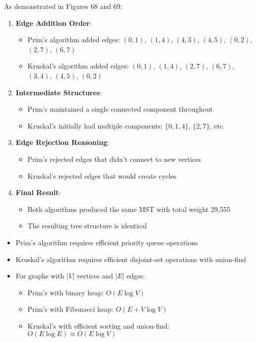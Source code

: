 \documentclass{article}
\theoremstyle{definition}
\begin{document}
As demonstrated in Figures 68 and 69:

\begin{enumerate}
\item \textbf{Edge Addition Order}:
   \begin{itemize}
   \item Prim's algorithm added edges: $(0,1)$, $(1,4)$, $(4,3)$, $(4,5)$, $(0,2)$, $(2,7)$, $(6,7)$
   \item Kruskal's algorithm added edges: $(0,1)$, $(1,4)$, $(2,7)$, $(6,7)$, $(3,4)$, $(4,5)$, $(0,2)$
   \end{itemize}

\item \textbf{Intermediate Structures}:
   \begin{itemize}
   \item Prim's maintained a single connected component throughout
   \item Kruskal's initially had multiple components: $\{0,1,4\}$, $\{2,7\}$, etc.
   \end{itemize}

\item \textbf{Edge Rejection Reasoning}:
   \begin{itemize}
   \item Prim's rejected edges that didn't connect to new vertices
   \item Kruskal's rejected edges that would create cycles
   \end{itemize}

\item \textbf{Final Result}:
   \begin{itemize}
   \item Both algorithms produced the same MST with total weight 29,555
   \item The resulting tree structure is identical
   \end{itemize}
\end{enumerate}

\begin{itemize}
\item Prim's algorithm requires efficient priority queue operations
\item Kruskal's algorithm requires efficient disjoint-set operations with union-find
\item For graphs with $|V|$ vertices and $|E|$ edges:
  \begin{itemize}
  \item Prim's with binary heap: $O(E \log V)$
  \item Prim's with Fibonacci heap: $O(E + V \log V)$
  \item Kruskal's with efficient sorting and union-find: $O(E \log E) \approx O(E \log V)$
  \end{itemize}
\end{itemize}
\end{document}
